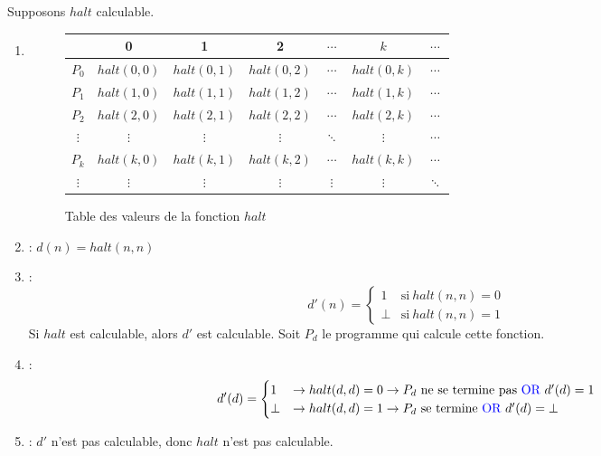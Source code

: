 Supposons $halt$ calculable.

\begin{enumerate}
\item {}
	\begin{figure}[H]
    		\centering
    		\begin{tabular}{c|cccccc}
		 & 0 & 1 & 2 & $\cdots$ & $k$ & $\cdots$ \\ 
		\hline 
		$P_0$ & $halt(0,0)$ & $halt(0,1)$ & $halt(0,2)$ & $\cdots$ & $halt(0,k)$ & $\cdots$ \\ 
		$P_1$ & $halt(1,0)$ & $halt(1,1)$ & $halt(1,2)$ & $\cdots$ & $halt(1,k)$ & $\cdots$ \\ 
		$P_2$ & $halt(2,0)$ & $halt(2,1)$ & $halt(2,2)$ & $\cdots$ & $halt(2,k)$ & $\cdots$ \\ 
		$\vdots$ & $\vdots$ & $\vdots$ & $\vdots$ & $\ddots$ & $\vdots$ & $\cdots$ \\ 
		$P_k$ & $halt(k,0)$ & $halt(k,1)$ & $halt(k,2)$ & $\cdots$ & $halt(k,k)$ & $\cdots$ \\ 
		$\vdots$ & $\vdots$ & $\vdots$ & $\vdots$ & $\vdots$ & $\vdots$ & $\ddots$ \\ 
		\end{tabular}
		\caption{Table des valeurs de la fonction $halt$}
	\end{figure}
\item {} : $d(n) = halt(n,n)$
\item {} :
	\begin{equation*}
		d'(n)=
		\begin{cases}
      		1 & \text{si}\ halt(n, n) = 0\\
      		\bot & \text{si}\ halt(n,n) = 1
      	\end{cases}
    \end{equation*}
    Si $halt$ est calculable, alors $d'$ est calculable. Soit $P_d$ le programme qui calcule cette fonction.
\item {} :
	\begin{equation*}
		d'(d)=
		\begin{cases}
      		1 & \rightarrow halt(d,d) = 0 \rightarrow P_d \text{ ne se termine pas \textblue{OR} }d'(d) = 1\\
      		\bot & \rightarrow halt(d,d) = 1 \rightarrow P_d \text{ se termine \textblue{OR} }d'(d) = \bot
      	\end{cases}
    \end{equation*}
\item {} : $d'$ n'est pas calculable, donc $halt$ n'est pas calculable.
\end{enumerate}


